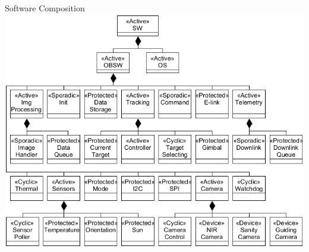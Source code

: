 \documentclass[11pt, aspectratio=169]{beamer}
\begin{document}
{
\begin{frame}[plain]
\label{slide:questions}
\end{frame}

}

\begin{frame}[c]{Software Composition}
    \centering
    \includegraphics[height=.9\textheight]{software/composition-tree.png}
\end{frame}
\end{document}
